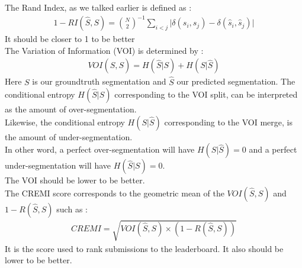 The Rand Index, as we talked earlier is defined as :\\
\begin{gather*}
	1 - RI(\hat{S},S) = \binom{N}{2}^{-1} \sum_{i<j} \lvert \delta(s_i,s_j) -
	\delta(\hat{s}_i,\hat{s}_j) \rvert
\end{gather*}
It should be closer to 1 to be better\\

The Variation of Information (VOI) is determined by :\\
\begin{gather*}
	VOI(\hat{S},S) = H(\hat{S}|S) + H(S|\hat{S})
\end{gather*}
Here $S$ is our groundtruth segmentation and $\hat{S}$ our predicted segmentation.
The conditional entropy $H(\hat{S}|S)$ corresponding to the VOI split, can be interpreted as the amount of over-segmentation.\\
Likewise, the conditional entropy $H(S|\hat{S})$ corresponding to the VOI merge, is the amount of under-segmentation.\\
In other word, a perfect over-segmentation will have $H(S|\hat{S}) = 0$ and a perfect under-segmentation will have $H(\hat{S}|S) = 0$.\\
The VOI should be lower to be better.\\

The CREMI score corresponds to the geometric mean of the $VOI(\hat{S},S)$ and $1-R(\hat{S},S)$ such as :\\
\begin{gather*}
	CREMI = \sqrt{VOI(\hat{S},S)\times (1 - R(\hat{S},S))}
\end{gather*}
It is the score used to rank submissions to the leaderboard. It also should be lower to be better.\\

